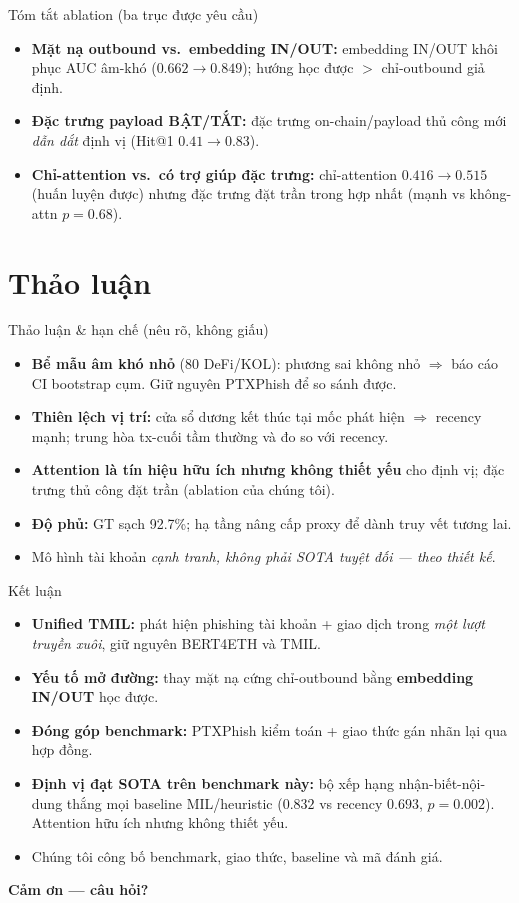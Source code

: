 \documentclass[aspectratio=169,10pt]{beamer}
\begin{document}
\begin{frame}{Tóm tắt ablation (ba trục được yêu cầu)}
\begin{itemize}
\item \textbf{Mặt nạ outbound vs.\ embedding IN/OUT:} embedding IN/OUT khôi phục AUC âm-khó ($0.662 \to 0.849$); hướng học được $>$ chỉ-outbound giả định.
\item \textbf{Đặc trưng payload BẬT/TẮT:} đặc trưng on-chain/payload thủ công mới \emph{dẫn dắt} định vị (Hit@1 $0.41 \to 0.83$).
\item \textbf{Chỉ-attention vs.\ có trợ giúp đặc trưng:} chỉ-attention $0.416\!\to\!0.515$ (huấn luyện được) nhưng đặc trưng đặt trần trong hợp nhất (mạnh vs không-attn $p{=}0.68$).
\end{itemize}
\end{frame}

\section{Thảo luận}
\begin{frame}{Thảo luận \& hạn chế (nêu rõ, không giấu)}
\begin{itemize}
\item \textbf{Bể mẫu âm khó nhỏ} (80 DeFi/KOL): phương sai không nhỏ $\Rightarrow$ báo cáo CI bootstrap cụm. Giữ nguyên PTXPhish để so sánh được.
\item \textbf{Thiên lệch vị trí:} cửa sổ dương kết thúc tại mốc phát hiện $\Rightarrow$ recency mạnh; trung hòa tx-cuối tầm thường và đo so với recency.
\item \textbf{Attention là tín hiệu hữu ích nhưng không thiết yếu} cho định vị; đặc trưng thủ công đặt trần (ablation của chúng tôi).
\item \textbf{Độ phủ:} GT sạch 92.7\%; hạ tầng nâng cấp proxy để dành truy vết tương lai.
\item Mô hình tài khoản \emph{cạnh tranh, không phải SOTA tuyệt đối --- theo thiết kế}.
\end{itemize}
\end{frame}

\begin{frame}{Kết luận}
\begin{itemize}
\item \textbf{Unified TMIL:} phát hiện phishing tài khoản + giao dịch trong \emph{một lượt truyền xuôi}, giữ nguyên BERT4ETH và TMIL.
\item \textbf{Yếu tố mở đường:} thay mặt nạ cứng chỉ-outbound bằng \textbf{embedding IN/OUT} học được.
\item \textbf{Đóng góp benchmark:} PTXPhish kiểm toán + giao thức gán nhãn lại qua hợp đồng.
\item \textbf{Định vị đạt SOTA trên benchmark này:} bộ xếp hạng nhận-biết-nội-dung thắng mọi baseline MIL/heuristic ($0.832$ vs recency $0.693$, $p{=}0.002$). Attention hữu ích nhưng không thiết yếu.
\item Chúng tôi công bố benchmark, giao thức, baseline và mã đánh giá.
\end{itemize}
\vfill
\centering\textbf{Cảm ơn --- câu hỏi?}
\end{frame}
\end{document}
